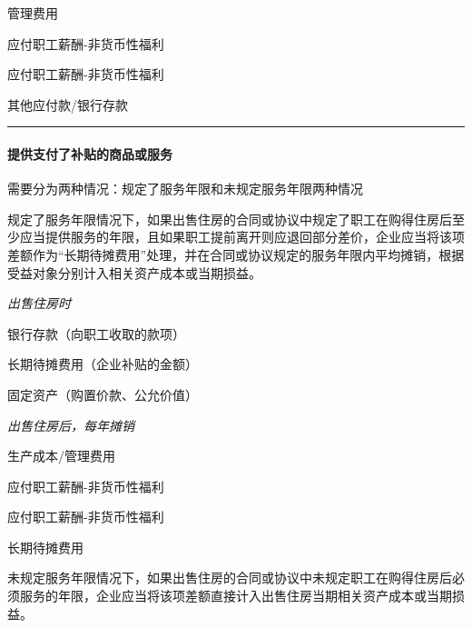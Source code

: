 \documentclass[UTF8,12pt]{ctexart}
\newenvironment{Dr}{%
	\begin{list}{}%
		{
			\setlength{\leftmargin}{2em}
			\setlength{\labelwidth}{2em}
			\setlength{\labelsep}{0pt}
			\setlength{\itemindent}{0pt}
			\setlength{\listparindent}{0pt}
			\setlength{\parsep}{0pt}
			\setlength{\topsep}{0pt}
		}
		\item[\textbf{借：}]
	}{%
	\end{list}
}
\newenvironment{Cr}{%
	\begin{list}{}%
		{
			\setlength{\leftmargin}{3em}
			\setlength{\labelwidth}{2em}
			\setlength{\labelsep}{0pt}
			\setlength{\itemindent}{0pt}
			\setlength{\listparindent}{0pt}
			\setlength{\parsep}{0pt}
			\setlength{\topsep}{0pt}
		}
		\item[\textbf{贷：}]
	}{%
	\end{list}
}
\numberwithin{equation}{section} %
\numberwithin{figure}{section}
\numberwithin{table}{section}
\begin{document}
	\begin{Dr}
		管理费用
	\end{Dr}
	\begin{Cr}
		应付职工薪酬-非货币性福利
	\end{Cr}
	
	\begin{Dr}
		应付职工薪酬-非货币性福利
	\end{Dr}
	\begin{Cr}
		其他应付款/银行存款
	\end{Cr}
	
	\vspace{5pt}
	\hrule
	\vspace{5pt}


	\paragraph{提供支付了补贴的商品或服务}
	需要分为两种情况：规定了服务年限和未规定服务年限两种情况
	
	规定了服务年限情况下，如果出售住房的合同或协议中规定了职工在购得住房后至少应当提供服务的年限，且如果职工提前离开则应退回部分差价，企业应当将该项差额作为“长期待摊费用”处理，并在合同或协议规定的服务年限内平均摊销，根据受益对象分别计入相关资产成本或当期损益。
	
	\textit{出售住房时}
	
	\begin{Dr}
		银行存款（向职工收取的款项）
		
		长期待摊费用（企业补贴的金额）
	\end{Dr}
	\begin{Cr}
		固定资产（购置价款、公允价值） 
	\end{Cr}
	
	\textit{出售住房后，每年摊销}
	
	\begin{Dr}
		生产成本/管理费用
	\end{Dr}
	\begin{Cr}
		应付职工薪酬-非货币性福利
	\end{Cr}
	
	\begin{Dr}
		应付职工薪酬-非货币性福利
	\end{Dr}
	\begin{Cr}
		长期待摊费用
	\end{Cr}

	未规定服务年限情况下，如果出售住房的合同或协议中未规定职工在购得住房后必须服务的年限，企业应当将该项差额直接计入出售住房当期相关资产成本或当期损益。
	
\end{document}
